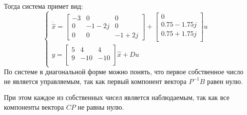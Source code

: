Тогда система примет вид: 
\begin{equation}
    \begin{cases}
        \dot{\hat{x}} = \begin{bmatrix}
            -3 & 0 & 0 \\
            0 & -1-2j & 0 \\
            0 & 0 & -1+2j
        \end{bmatrix} + \begin{bmatrix}
            0 \\
            0.75-1.75j \\
            0.75+1.75j \\
        \end{bmatrix} u \\ 
        y = \begin{bmatrix}
            5 & 4 & 4 \\
            9 & -10 & -10 \\
        \end{bmatrix} \hat{x} + Du 
    \end{cases}
    \label{eq:task4_diag}
\end{equation}
По системе в диагональной форме можно понять, что первое собственное число 
не является управляемым, так как первый компонент вектора $P^{-1}B$ равен нулю. 

При этом каждое из собственных чисел является наблюдаемым, так как все компоненты вектора $CP$ не равны нулю. 

